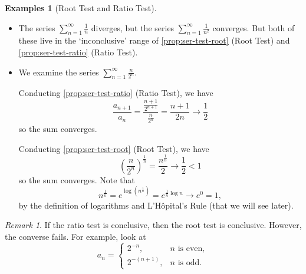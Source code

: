 \documentclass[11pt]{article}
\numberwithin{equation}{section}
\theoremstyle{definition}
\newtheorem{examples}[theorem]{Examples}
\theoremstyle{remark}
\newtheorem{remark}[theorem]{Remark}
\newcommand{\pqty}[1]{\left(#1\right)}
\begin{document}
\begin{examples}[Root Test and Ratio Test]\label{analysis-unit-0046}
    \label{ex:ser-test-root-ratio}%
    \begin{itemize}
        \item The series \(\sum_{n = 1}^{\infty} \frac{1}{n}\) diverges, but the series \(\sum_{n = 1}^{\infty} \frac{1}{n^2}\) converges. But both of these live in the `inconclusive' range of \autoref{prop:ser-test-root} (Root Test) and \autoref{prop:ser-test-ratio} (Ratio Test).
        \item We examine the series \(\sum_{n = 1}^{\infty} \frac{n}{2^n}\).
        
        Conducting \autoref{prop:ser-test-ratio} (Ratio Test), we have
        \[
            \frac{a_{n + 1}}{a_n} = \frac{\frac{n + 1}{2^{n + 1}}}{\frac{n}{2^n}} = \frac{n + 1}{2n} \to \frac{1}{2}
        \]
        so the sum converges.

        Conducting \autoref{prop:ser-test-root} (Root Test), we have
        \[
            \pqty{\frac{n}{2^n}}^{\frac{1}{n}} = \frac{n^{\frac{1}{n}}}{2} \to \frac{1}{2} < 1
        \]
        so the sum converges. Note that
        \[
            n^{\frac{1}{n}} = e^{\log\pqty{n^{\frac{1}{n}}}} = e^{\frac{1}{n} \log n} \to e^0 = 1,
        \]
        by the definition of logarithms and L'H\^{o}pital's Rule (that we will see later).
    \end{itemize}
\end{examples}

\begin{remark}\label{analysis-unit-0047}
    If the ratio test is conclusive, then the root test is conclusive. However, the converse fails. For example, look at
    \[
        a_n = \begin{cases}
            2^{-n}, & n\text{ is even}, \\
            2^{-\pqty{n + 1}}, & n\text{ is odd}.
        \end{cases}
    \]
\end{remark}
\end{document}
